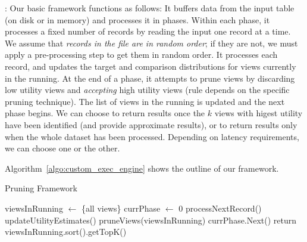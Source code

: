 :
\label{subsec:basic_framework}
Our basic framework functions as follows: It buffers data from the input table (on disk or in memory) and processes it in phases. 
Within each phase, it processes a fixed number of records by reading the input 
one record at a time.
We assume that {\it records in the file are in random order}; if they are not,
we must apply a pre-processing step to get them in random order.
It processes each record, and updates the target and comparison distributions for views currently in the running.
At the end of a phase, it attempts to prune views by discarding low utility views and
{\it accepting} high utility views (rule depends on the specific pruning technique).
The list of views in the running is updated and the next phase begins.
We can choose to return results once the $k$ views with higest utility have been identified (and provide approximate results), or to return results only when the whole dataset has been processed.
Depending on latency requirements, we can choose one or the other.

Algorithm~\ref{algo:custom_exec_engine} shows the outline of our framework.

\begin{algorithm}[h]
\caption{Pruning Framework}
\label{algo:custom_exec_engine}
\begin{algorithmic}[1]
\State viewsInRunning $\gets$ \{all views\}
\State currPhase $\gets$ 0
\State processNextRecord()
\State updateUtilityEstimates()
\State pruneViews(viewsInRunning)
\State currPhase.Next()
\EndIf
\EndWhile
\State return viewsInRunning.sort().getTopK()
\end{algorithmic}
\end{algorithm}


